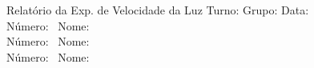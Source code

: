 \documentclass[a4paper,12pt]{article}  %
\author{Prof. Bernardo B. Carvalho}
\date{ Setembro 2015}
\newcommand{\HRule}{\rule{\linewidth}{0.5mm}}
\begin{document}
 



{  \sf  Relatório da Exp. de Velocidade da Luz} %
Turno:\underline{\makebox[2cm][l]{~}} Grupo:\underline{\makebox[1cm][l]{~}} Data:\underline{\makebox[2cm][l]{~}}\\
\noindent Número:~\underline{\makebox[2cm][r]{~}} Nome:~\underline{\makebox[10cm][r]{~}} \\
\noindent Número:~\underline{\makebox[2cm][r]{~}} Nome:~\underline{\makebox[10cm][r]{~}} \\
\noindent Número:~\underline{\makebox[2cm][r]{~}} Nome:~\underline{\makebox[10cm][r]{~}} 
\end{document}
